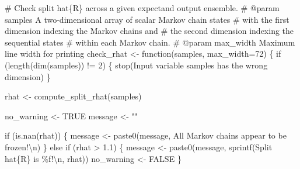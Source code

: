 \documentclass[
  letterpaper,
  DIV=11,
  numbers=noendperiod]{scrartcl}
\newenvironment{Shaded}{\begin{snugshade}}{\end{snugshade}}
\newcommand{\CharTok}[1]{\textcolor[rgb]{0.13,0.47,0.30}{#1}}
\newcommand{\CommentTok}[1]{\textcolor[rgb]{0.37,0.37,0.37}{#1}}
\newcommand{\ControlFlowTok}[1]{\textcolor[rgb]{0.00,0.23,0.31}{#1}}
\newcommand{\DecValTok}[1]{\textcolor[rgb]{0.68,0.00,0.00}{#1}}
\newcommand{\FloatTok}[1]{\textcolor[rgb]{0.68,0.00,0.00}{#1}}
\newcommand{\KeywordTok}[1]{\textcolor[rgb]{0.00,0.23,0.31}{#1}}
\newcommand{\NormalTok}[1]{\textcolor[rgb]{0.00,0.23,0.31}{#1}}
\newcommand{\OperatorTok}[1]{\textcolor[rgb]{0.37,0.37,0.37}{#1}}
\newcommand{\SpecialCharTok}[1]{\textcolor[rgb]{0.37,0.37,0.37}{#1}}
\newcommand{\StringTok}[1]{\textcolor[rgb]{0.13,0.47,0.30}{#1}}
\begin{document}
\begin{Shaded}
\begin{Highlighting}[]
\CommentTok{\# Check split hat\{R\} across a given expectand output ensemble.}
\CommentTok{\# @param samples A two{-}dimensional array of scalar Markov chain states }
\CommentTok{\#                with the first dimension indexing the Markov chains and }
\CommentTok{\#                the second dimension indexing the sequential states }
\CommentTok{\#                within each Markov chain.}
\CommentTok{\# @param max\_width Maximum line width for printing}
\NormalTok{check\_rhat }\OperatorTok{\textless{}{-}}\NormalTok{ function(samples, max\_width}\OperatorTok{=}\DecValTok{72}\NormalTok{) \{}
  \ControlFlowTok{if}\NormalTok{ (length(dim(samples)) }\OperatorTok{!=} \DecValTok{2}\NormalTok{) \{}
\NormalTok{    stop(}\StringTok{\textquotesingle{}Input variable \textasciigrave{}samples\textasciigrave{} has the wrong dimension\textquotesingle{}}\NormalTok{)}
\NormalTok{  \}}

\NormalTok{  rhat }\OperatorTok{\textless{}{-}}\NormalTok{ compute\_split\_rhat(samples)}

\NormalTok{  no\_warning }\OperatorTok{\textless{}{-}}\NormalTok{ TRUE}
\NormalTok{  message }\OperatorTok{\textless{}{-}} \StringTok{""}

  \ControlFlowTok{if}\NormalTok{ (}\KeywordTok{is}\NormalTok{.nan(rhat)) \{}
\NormalTok{    message }\OperatorTok{\textless{}{-}}\NormalTok{ paste0(message, }
                      \StringTok{\textquotesingle{}All Markov chains appear to be frozen!}\CharTok{\textbackslash{}n}\StringTok{\textquotesingle{}}\NormalTok{)}
\NormalTok{  \} }\ControlFlowTok{else} \ControlFlowTok{if}\NormalTok{ (rhat }\OperatorTok{\textgreater{}} \FloatTok{1.1}\NormalTok{) \{}
\NormalTok{    message }\OperatorTok{\textless{}{-}}\NormalTok{ paste0(message, sprintf(}\StringTok{\textquotesingle{}Split hat}\SpecialCharTok{\{R\}}\StringTok{ is }\SpecialCharTok{\%f}\StringTok{!}\CharTok{\textbackslash{}n}\StringTok{\textquotesingle{}}\NormalTok{, rhat))}
\NormalTok{    no\_warning }\OperatorTok{\textless{}{-}}\NormalTok{ FALSE}
\NormalTok{  \}}
  

\end{Highlighting}
\end{Shaded}
\end{document}
